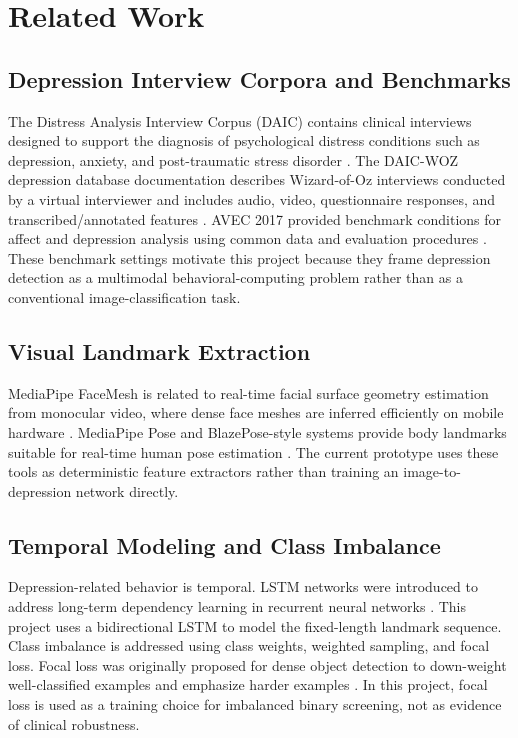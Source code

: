 \documentclass[conference]{IEEEtran}
\begin{document}
\section{Related Work}
\subsection{Depression Interview Corpora and Benchmarks}
The Distress Analysis Interview Corpus (DAIC) contains clinical interviews designed to support the diagnosis of psychological distress conditions such as depression, anxiety, and post-traumatic stress disorder \cite{gratch_daic}. The DAIC-WOZ depression database documentation describes Wizard-of-Oz interviews conducted by a virtual interviewer and includes audio, video, questionnaire responses, and transcribed/annotated features \cite{daic_doc}. AVEC 2017 provided benchmark conditions for affect and depression analysis using common data and evaluation procedures \cite{ringeval_avec2017}. These benchmark settings motivate this project because they frame depression detection as a multimodal behavioral-computing problem rather than as a conventional image-classification task.

\subsection{Visual Landmark Extraction}
MediaPipe FaceMesh is related to real-time facial surface geometry estimation from monocular video, where dense face meshes are inferred efficiently on mobile hardware \cite{kartynnik_facemesh}. MediaPipe Pose and BlazePose-style systems provide body landmarks suitable for real-time human pose estimation \cite{grishchenko_blazepose}. The current prototype uses these tools as deterministic feature extractors rather than training an image-to-depression network directly.

\subsection{Temporal Modeling and Class Imbalance}
Depression-related behavior is temporal. LSTM networks were introduced to address long-term dependency learning in recurrent neural networks \cite{hochreiter_lstm}. This project uses a bidirectional LSTM to model the fixed-length landmark sequence. Class imbalance is addressed using class weights, weighted sampling, and focal loss. Focal loss was originally proposed for dense object detection to down-weight well-classified examples and emphasize harder examples \cite{lin_focal}. In this project, focal loss is used as a training choice for imbalanced binary screening, not as evidence of clinical robustness.
\end{document}
